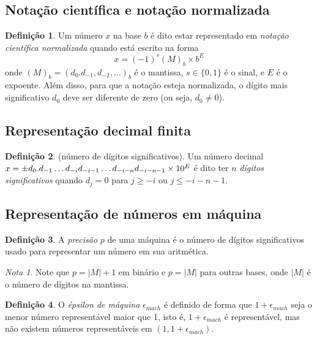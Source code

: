 \documentclass[12pt]{article}
\theoremstyle{plain}
\theoremstyle{definition}
\newtheorem{defn}{Definição}[section]
\theoremstyle{remark}
\newtheorem*{rem}{Nota}
\begin{document}
\subsection{Notação científica e notação normalizada}

\begin{defn}
    Um número \(x\) na base \(b\) é dito estar representado em \emph{notação científica normalizada} quando está escrito na forma
    \begin{equation}
        x = (-1)^s (M)_b \times b^E
    \end{equation}
    onde \((M)_b = (d_0. d_{-1}, d_{-2}, \ldots)_b\) é o mantissa, \(s \in \{0, 1\}\) é o sinal, e \(E\) é o expoente. Além disso, para que a notação esteja normalizada, o dígito mais significativo \(d_0\) deve ser diferente de zero (ou seja, \(d_0 \neq 0\)).
\end{defn}

\subsection{Representação decimal finita}

\begin{defn} (número de dígitos significativos).
    Um número decimal \(x = \pm d_0. d_{-1}\ldots d_{-i}\linebreak d_{-i-1}\ldots d_{-i-n}d_{-i-n-1} \times 10^E\) é dito ter \(n\) \emph{dígitos significativos} quando \(d_j = 0\) para \(j \geq -i\) ou \(j \leq -i-n-1\).
\end{defn}

\subsection{Representação de números em máquina}

\begin{defn}
    A \emph{precisão} \(p\) de uma máquina é o número de dígitos significativos usado para representar um número em sua aritmética.
\end{defn}

\begin{rem}
    Note que \(p = \vert M \vert + 1\) em binário e \(p =\vert M \vert\) para outras bases, onde \(\vert M \vert\) é o número de dígitos na mantissa.
\end{rem}

\begin{defn}
    O \emph{épsilon de máquina} \(\epsilon_{mach}\) é definido de forma que \(1+\epsilon_{mach}\) seja o menor número representável maior que 1, isto é, \(1+\epsilon_{mach}\) é representável, mas não existem números representáveis em \((1, 1+\epsilon_{mach})\).
\end{defn}
\end{document}
